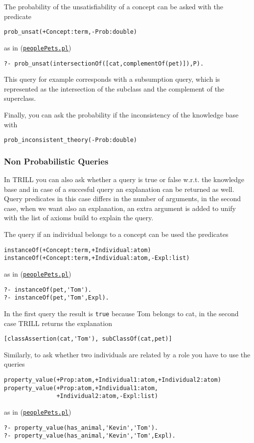 The probability of the unsatisfiability of a concept can be asked with the predicate
\begin{verbatim}
prob_unsat(+Concept:term,-Prob:double)
\end{verbatim}
as in (\href{http://trill.lamping.unife.it/example/trill/peoplePets.pl}{\texttt{peoplePets.pl}})
\begin{verbatim}
?- prob_unsat(intersectionOf([cat,complementOf(pet)]),P).
\end{verbatim}
This query for example corresponds with a subsumption query, which is represented as the intersection of the subclass and the complement of the superclass.

Finally, you can ask the probability if the inconsistency of the knowledge base with
\begin{verbatim}
prob_inconsistent_theory(-Prob:double)
\end{verbatim}

\subsubsection{Non Probabilistic Queries}
In TRILL you can also ask whether a query is true or false w.r.t. the knowledge base and in case of a succesful query an explanation can be returned as well. 
Query predicates in this case differs in the number of arguments, in the second case, when we want also an explanation, an extra argument is added to unify with the list of axioms
build to explain the query.

The query if an individual belongs to a concept can be used the predicates
\begin{verbatim}
instanceOf(+Concept:term,+Individual:atom)
instanceOf(+Concept:term,+Individual:atom,-Expl:list)
\end{verbatim}
as in (\href{http://trill.lamping.unife.it/example/trill/peoplePets.pl}{\texttt{peoplePets.pl}})
\begin{verbatim}
?- instanceOf(pet,'Tom').
?- instanceOf(pet,'Tom',Expl).
\end{verbatim}
In the first query the result is \verb|true| because Tom belongs to cat, in the second case TRILL returns the explanation 
\begin{verbatim}
[classAssertion(cat,'Tom'), subClassOf(cat,pet)]
\end{verbatim}


Similarly, to ask whether two individuals are related by a role you have to use the queries
\begin{verbatim}
property_value(+Prop:atom,+Individual1:atom,+Individual2:atom)
property_value(+Prop:atom,+Individual1:atom,
               +Individual2:atom,-Expl:list)
\end{verbatim}
as in (\href{http://trill.lamping.unife.it/example/trill/peoplePets.pl}{\texttt{peoplePets.pl}})
\begin{verbatim}
?- property_value(has_animal,'Kevin','Tom').
?- property_value(has_animal,'Kevin','Tom',Expl).
\end{verbatim}

